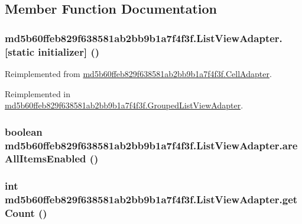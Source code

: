 \subsection{Member Function Documentation}
\hypertarget{classmd5b60ffeb829f638581ab2bb9b1a7f4f3f_1_1_list_view_adapter_95ad609e7ba116f4309bf26405bbcd43}{
\subsubsection[{[static initializer]}]{\setlength{\rightskip}{0pt plus 5cm}md5b60ffeb829f638581ab2bb9b1a7f4f3f.ListViewAdapter.\mbox{[}static initializer\mbox{]} ()}}
\label{classmd5b60ffeb829f638581ab2bb9b1a7f4f3f_1_1_list_view_adapter_95ad609e7ba116f4309bf26405bbcd43}




Reimplemented from \hyperlink{classmd5b60ffeb829f638581ab2bb9b1a7f4f3f_1_1_cell_adapter_c7c95358c7dafe01adfe68203283f13b}{md5b60ffeb829f638581ab2bb9b1a7f4f3f.CellAdapter}.

Reimplemented in \hyperlink{classmd5b60ffeb829f638581ab2bb9b1a7f4f3f_1_1_grouped_list_view_adapter_fe703df4896b7de21a64f688845fb595}{md5b60ffeb829f638581ab2bb9b1a7f4f3f.GroupedListViewAdapter}.\hypertarget{classmd5b60ffeb829f638581ab2bb9b1a7f4f3f_1_1_list_view_adapter_2c591a49427e11f184e70d0db0678c5d}{
\subsubsection[{areAllItemsEnabled}]{\setlength{\rightskip}{0pt plus 5cm}boolean md5b60ffeb829f638581ab2bb9b1a7f4f3f.ListViewAdapter.areAllItemsEnabled ()}}
\label{classmd5b60ffeb829f638581ab2bb9b1a7f4f3f_1_1_list_view_adapter_2c591a49427e11f184e70d0db0678c5d}


\hypertarget{classmd5b60ffeb829f638581ab2bb9b1a7f4f3f_1_1_list_view_adapter_9f24848499759eacb32669883ca93995}{
\subsubsection[{getCount}]{\setlength{\rightskip}{0pt plus 5cm}int md5b60ffeb829f638581ab2bb9b1a7f4f3f.ListViewAdapter.getCount ()}}
\label{classmd5b60ffeb829f638581ab2bb9b1a7f4f3f_1_1_list_view_adapter_9f24848499759eacb32669883ca93995}


